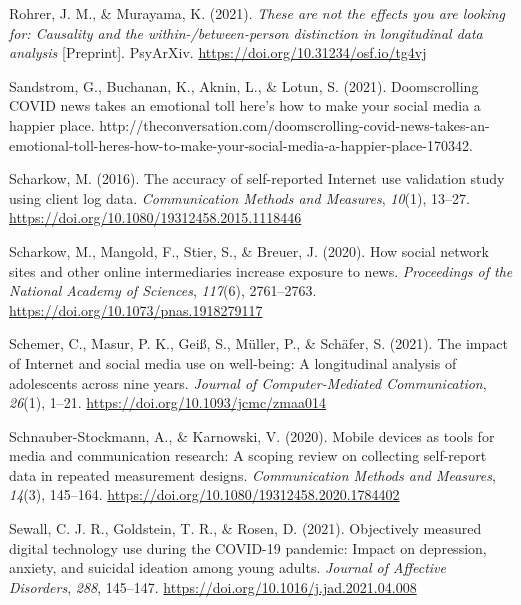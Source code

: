 \documentclass[
  man,mask]{apa6}
\newlength{\cslhangindent}
\newlength{\cslentryspacingunit} %
\newenvironment{CSLReferences}[2] %
 {%
  \setlength{\parindent}{0pt}
  \ifodd #1
  \let\oldpar\par
  \def\par{\hangindent=\cslhangindent\oldpar}
  \fi
  \setlength{\parskip}{#2\cslentryspacingunit}
 }%
 {}
\begin{document}
\begin{CSLReferences}{1}{0}
\leavevmode{}%
Rohrer, J. M., \& Murayama, K. (2021). \emph{These are not the effects you are looking for: {Causality} and the within-/between-person distinction in longitudinal data analysis} {[}Preprint{]}. {PsyArXiv}. \url{https://doi.org/10.31234/osf.io/tg4vj}

\leavevmode{}%
Sandstrom, G., Buchanan, K., Aknin, L., \& Lotun, S. (2021). Doomscrolling {COVID} news takes an emotional toll \textendash{} here's how to make your social media a happier place. http://theconversation.com/doomscrolling-covid-news-takes-an-emotional-toll-heres-how-to-make-your-social-media-a-happier-place-170342.

\leavevmode{}%
Scharkow, M. (2016). The accuracy of self-reported {Internet} use validation study using client log data. \emph{Communication Methods and Measures}, \emph{10}(1), 13--27. \url{https://doi.org/10.1080/19312458.2015.1118446}

\leavevmode{}%
Scharkow, M., Mangold, F., Stier, S., \& Breuer, J. (2020). How social network sites and other online intermediaries increase exposure to news. \emph{Proceedings of the National Academy of Sciences}, \emph{117}(6), 2761--2763. \url{https://doi.org/10.1073/pnas.1918279117}

\leavevmode{}%
Schemer, C., Masur, P. K., Geiß, S., Müller, P., \& Schäfer, S. (2021). The impact of {Internet} and social media use on well-being: {A} longitudinal analysis of adolescents across nine years. \emph{Journal of Computer-Mediated Communication}, \emph{26}(1), 1--21. \url{https://doi.org/10.1093/jcmc/zmaa014}

\leavevmode{}%
Schnauber-Stockmann, A., \& Karnowski, V. (2020). Mobile devices as tools for media and communication research: {A} scoping review on collecting self-report data in repeated measurement designs. \emph{Communication Methods and Measures}, \emph{14}(3), 145--164. \url{https://doi.org/10.1080/19312458.2020.1784402}

\leavevmode{}%
Sewall, C. J. R., Goldstein, T. R., \& Rosen, D. (2021). Objectively measured digital technology use during the {COVID-19} pandemic: {Impact} on depression, anxiety, and suicidal ideation among young adults. \emph{Journal of Affective Disorders}, \emph{288}, 145--147. \url{https://doi.org/10.1016/j.jad.2021.04.008}


\end{CSLReferences}
\end{document}

